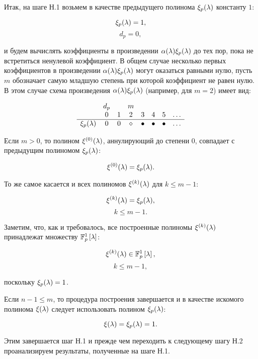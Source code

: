 Итак, на шаге Н.1 возьмем в качестве предыдущего полинома $\xi_p (\lambda)$ константу $1$:

	\begin{equation} \label{equation:FPAP:previous_polynomial_initialization}
		\xi_p (\lambda) = 1,
	\end{equation}
	$$ d_p = 0, $$

и будем вычислять коэффициенты в произведении $\alpha (\lambda) \xi_p (\lambda)$ до тех пор, пока не встретиться ненулевой коэффициент.
В общем случае несколько первых коэффициентов в произведении $\alpha (\lambda) \xi_p (\lambda)$ могут оказаться равными нулю,
пусть $m$ обозначает самую младшую степень при которой коэффициент не равен нулю. В этом случае схема произведения
$\alpha (\lambda) \xi_p (\lambda)$ (например, для $m=2$) имеет вид:

	$$
		\begin{array}{cccccccc}
			                   & d_p &   & m        &         &         &         & \\
			                   & 0   & 1 & 2        & 3       & 4       & 5       & \dots \\
			\hline
			\xi_p (\lambda) & 0   & 0 & \diamond & \bullet & \bullet & \bullet & \dots \\
		\end{array}
	$$

Если $m>0$, то полином $\xi^{(0)} (\lambda)$, аннулирующий до степени 0, совпадает с предыдущим полиномом $\xi_p (\lambda)$:

	$$ \xi^{(0)} (\lambda) = \xi_p (\lambda). $$

То же самое касается и всех полиномов $\xi^{(k)} (\lambda)$ для $k \le m-1$:

	$$ \xi^{(k)} (\lambda) = \xi_p (\lambda), $$
	$$ k \le m-1. $$

Заметим, что, как и требовалось, все построенные полиномы $\xi^{(k)} (\lambda)$ принадлежат множеству $\mathbb{F}_p^1 \left [ \lambda \right ]$:

	$$ \xi^{(k)} (\lambda) \in \mathbb{F}_p^1 \left [ \lambda \right ], $$
	$$ k \le m-1, $$

поскольку $\xi_p (\lambda) = 1$.

Если $n-1 \le m$, то процедура построения завершается и в качестве искомого полинома $\xi (\lambda)$ следует использовать полином
$\xi_p (\lambda)$:

	$$ \xi (\lambda) = \xi_p (\lambda) = 1. $$

Этим завершается шаг Н.1 и прежде чем переходить к следующему шагу Н.2 проанализируем результаты, полученные на шаге Н.1.

